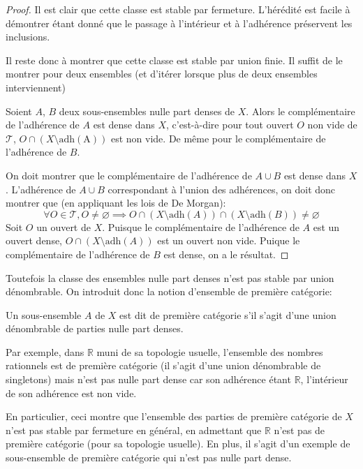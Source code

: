 \begin{proof}
  Il est clair que cette classe est stable par fermeture. L'hérédité est
  facile à démontrer étant donné que le passage à l'intérieur et à l'adhérence
  préservent les inclusions.

  Il reste donc à montrer que cette classe est stable par union finie.
  Il suffit de le montrer pour deux ensembles (et d'itérer lorsque plus de
  deux ensembles interviennent)

  Soient
  $A$, $B$ deux sous-ensembles nulle part denses de $X$. Alors le complémentaire
  de l'adhérence de $A$ est dense dans $X$, c'est-à-dire pour tout ouvert $O$ non vide
  de $\mathcal{T}$, $O\cap (X\setminus \mathrm{adh(A)})$ est non vide. De même
  pour le complémentaire de l'adhérence de $B$.

  On doit montrer que le complémentaire de l'adhérence de $A\cup B$ est dense
  dans $X$. L'adhérence de $A\cup B$ correspondant à l'union des adhérences,
  on doit donc montrer que (en appliquant les lois de De Morgan):
  $$\forall O \in \mathcal{T}, O\neq \varnothing\implies
  O \cap (X\setminus \mathrm{adh}(A))\cap (X\setminus \mathrm{adh}(B))\neq\varnothing$$
  Soit $O$ un ouvert de $X$.
  Puisque le complémentaire de l'adhérence de $A$ est un ouvert dense,
  $O\cap (X\setminus \mathrm{adh}(A))$ est un ouvert non vide. Puique
  le complémentaire de l'adhérence de $B$ est dense, on a le résultat.
\end{proof}

Toutefois la classe des ensembles nulle part denses n'est pas stable par union
dénombrable. On introduit donc la notion d'ensemble de première catégorie:

\begin{df}
  Un sous-ensemble $A$ de $X$ est dit de première catégorie s'il s'agit d'une
  union dénombrable de parties nulle part denses.
\end{df}

Par exemple, dans $\mathbb{R}$ muni de sa topologie usuelle, l'ensemble
des nombres rationnels est de première catégorie (il s'agit d'une union
dénombrable de singletons) mais n'est pas nulle part dense car son
adhérence étant $\mathbb{R}$, l'intérieur de son adhérence est non vide.

En particulier, ceci montre que l'ensemble des parties de première
catégorie de $X$ n'est pas stable par fermeture en général, en admettant
que $\mathbb{R}$ n'est pas de première catégorie (pour sa topologie usuelle).
En plus, il s'agit d'un exemple de sous-ensemble de première catégorie qui
n'est pas nulle part dense.

